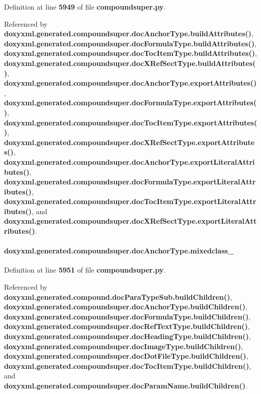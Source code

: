 Definition at line {\bf 5949} of file {\bf compoundsuper.\+py}.



Referenced by {\bf doxyxml.\+generated.\+compoundsuper.\+doc\+Anchor\+Type.\+build\+Attributes()}, {\bf doxyxml.\+generated.\+compoundsuper.\+doc\+Formula\+Type.\+build\+Attributes()}, {\bf doxyxml.\+generated.\+compoundsuper.\+doc\+Toc\+Item\+Type.\+build\+Attributes()}, {\bf doxyxml.\+generated.\+compoundsuper.\+doc\+X\+Ref\+Sect\+Type.\+build\+Attributes()}, {\bf doxyxml.\+generated.\+compoundsuper.\+doc\+Anchor\+Type.\+export\+Attributes()}, {\bf doxyxml.\+generated.\+compoundsuper.\+doc\+Formula\+Type.\+export\+Attributes()}, {\bf doxyxml.\+generated.\+compoundsuper.\+doc\+Toc\+Item\+Type.\+export\+Attributes()}, {\bf doxyxml.\+generated.\+compoundsuper.\+doc\+X\+Ref\+Sect\+Type.\+export\+Attributes()}, {\bf doxyxml.\+generated.\+compoundsuper.\+doc\+Anchor\+Type.\+export\+Literal\+Attributes()}, {\bf doxyxml.\+generated.\+compoundsuper.\+doc\+Formula\+Type.\+export\+Literal\+Attributes()}, {\bf doxyxml.\+generated.\+compoundsuper.\+doc\+Toc\+Item\+Type.\+export\+Literal\+Attributes()}, and {\bf doxyxml.\+generated.\+compoundsuper.\+doc\+X\+Ref\+Sect\+Type.\+export\+Literal\+Attributes()}.

\paragraph[{mixedclass\+\_\+}]{\setlength{\rightskip}{0pt plus 5cm}doxyxml.\+generated.\+compoundsuper.\+doc\+Anchor\+Type.\+mixedclass\+\_\+}\label{classdoxyxml_1_1generated_1_1compoundsuper_1_1docAnchorType_a77e461ea37a035db01ee5a3144bb12d2}


Definition at line {\bf 5951} of file {\bf compoundsuper.\+py}.



Referenced by {\bf doxyxml.\+generated.\+compound.\+doc\+Para\+Type\+Sub.\+build\+Children()}, {\bf doxyxml.\+generated.\+compoundsuper.\+doc\+Anchor\+Type.\+build\+Children()}, {\bf doxyxml.\+generated.\+compoundsuper.\+doc\+Formula\+Type.\+build\+Children()}, {\bf doxyxml.\+generated.\+compoundsuper.\+doc\+Ref\+Text\+Type.\+build\+Children()}, {\bf doxyxml.\+generated.\+compoundsuper.\+doc\+Heading\+Type.\+build\+Children()}, {\bf doxyxml.\+generated.\+compoundsuper.\+doc\+Image\+Type.\+build\+Children()}, {\bf doxyxml.\+generated.\+compoundsuper.\+doc\+Dot\+File\+Type.\+build\+Children()}, {\bf doxyxml.\+generated.\+compoundsuper.\+doc\+Toc\+Item\+Type.\+build\+Children()}, and {\bf doxyxml.\+generated.\+compoundsuper.\+doc\+Param\+Name.\+build\+Children()}.

